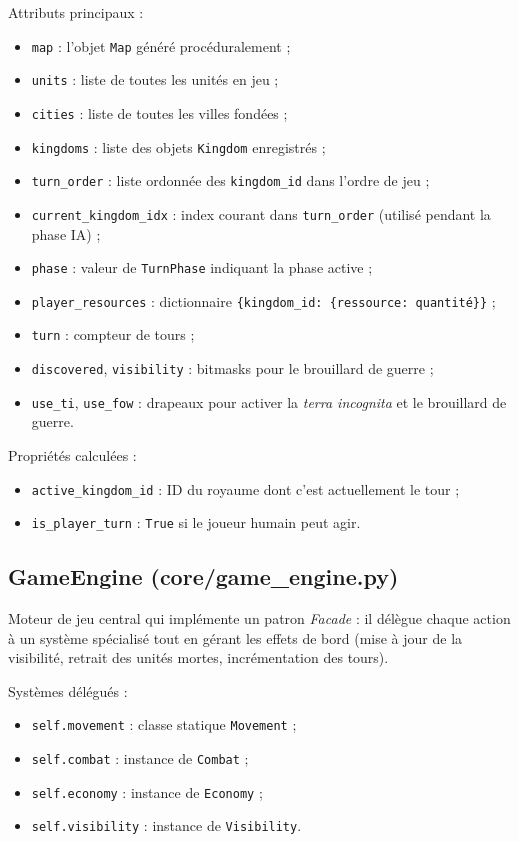 \documentclass[12pt, a4paper]{article}
\begin{document}
Attributs principaux :
\begin{itemize}
    \item \texttt{map} : l'objet \texttt{Map} généré procéduralement ;
    \item \texttt{units} : liste de toutes les unités en jeu ;
    \item \texttt{cities} : liste de toutes les villes fondées ;
    \item \texttt{kingdoms} : liste des objets \texttt{Kingdom} enregistrés ;
    \item \texttt{turn\_order} : liste ordonnée des \texttt{kingdom\_id} dans l'ordre de jeu ;
    \item \texttt{current\_kingdom\_idx} : index courant dans \texttt{turn\_order} (utilisé pendant la phase IA) ;
    \item \texttt{phase} : valeur de \texttt{TurnPhase} indiquant la phase active ;
    \item \texttt{player\_resources} : dictionnaire \texttt{\{kingdom\_id: \{ressource: quantité\}\}} ;
    \item \texttt{turn} : compteur de tours ;
    \item \texttt{discovered}, \texttt{visibility} : bitmasks pour le brouillard de guerre ;
    \item \texttt{use\_ti}, \texttt{use\_fow} : drapeaux pour activer la \textit{terra incognita} et
    le brouillard de guerre.
\end{itemize}

Propriétés calculées :
\begin{itemize}
    \item \texttt{active\_kingdom\_id} : ID du royaume dont c'est actuellement le tour ;
    \item \texttt{is\_player\_turn} : \texttt{True} si le joueur humain peut agir.
\end{itemize}

\subsection{GameEngine (core/game\_engine.py)}

Moteur de jeu central qui implémente un patron \textit{Facade} : il délègue chaque action à
un système spécialisé tout en gérant les effets de bord (mise à jour de la visibilité, retrait
des unités mortes, incrémentation des tours).

Systèmes délégués :
\begin{itemize}
    \item \texttt{self.movement} : classe statique \texttt{Movement} ;
    \item \texttt{self.combat} : instance de \texttt{Combat} ;
    \item \texttt{self.economy} : instance de \texttt{Economy} ;
    \item \texttt{self.visibility} : instance de \texttt{Visibility}.
\end{itemize}
\end{document}
